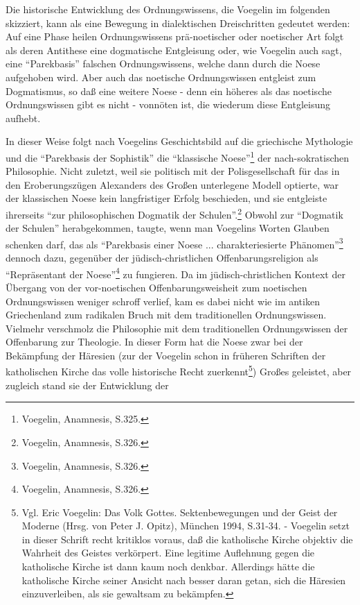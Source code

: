 Die historische Entwicklung des Ordnungswissens, die Voegelin im folgenden
skizziert, kann als eine Bewegung in dialektischen Dreischritten gedeutet
werden: Auf eine Phase heilen Ordnungswissens prä-noetischer oder noetischer
Art folgt als deren Antithese eine dogmatische Entgleisung oder, wie Voegelin
auch sagt, eine "`Parekbasis"' falschen Ordnungswissens, welche dann durch die
Noese aufgehoben wird. Aber auch das noetische Ordnungswissen entgleist zum
Dogmatismus, so daß eine weitere Noese - denn ein höheres als das noetische
Ordnungswissen gibt es nicht - vonnöten ist, die wiederum diese Entgleisung 
aufhebt.

In dieser Weise folgt nach Voegelins Geschichtsbild auf die griechische
Mythologie und die "`Parekbasis der Sophistik"' die "`klassische
Noese"'\footnote{Voegelin, Anamnesis, S.325.} der nach-sokratischen
Philosophie. Nicht zuletzt, weil sie politisch mit der Polisgesellschaft für
das in den Eroberungszügen Alexanders des Großen unterlegene Modell optierte,
war der klassischen Noese kein langfristiger Erfolg beschieden, und sie
entgleiste ihrerseits "`zur philosophischen Dogmatik der
Schulen"'.\footnote{Voegelin, Anamnesis, S.326.} Obwohl zur "`Dogmatik der
Schulen"' herabgekommen, taugte, wenn man Voegelins Worten Glauben schenken
darf, das als "`Parekbasis einer Noese ...  charakteriesierte
Phänomen"'\footnote{Voegelin, Anamnesis, S.326.} dennoch dazu, gegenüber der
jüdisch-christlichen Offenbarungsreligion als "`Repräsentant der
Noese"'\footnote{Voegelin, Anamnesis, S.326.} zu fungieren. Da im
jüdisch-christlichen Kontext der Übergang von der vor-noetischen
Offenbarungsweisheit zum noetischen Ordnungswissen weniger schroff verlief,
kam es dabei nicht wie im antiken Griechenland zum radikalen Bruch mit dem
traditionellen Ordnungswissen. Vielmehr verschmolz die Philosophie mit dem
traditionellen Ordnungswissen der Offenbarung zur Theologie. In dieser Form
hat die Noese zwar bei der Bekämpfung der Häresien (zur der Voegelin schon in
früheren Schriften der katholischen Kirche das volle historische Recht
zuerkennt\footnote{Vgl. Eric Voegelin: Das Volk Gottes. Sektenbewegungen
  und der Geist der Moderne (Hrsg. von Peter J. Opitz), München 1994, S.31-34.
  - Voegelin setzt in dieser Schrift recht kritiklos voraus, daß die
  katholische Kirche objektiv die Wahrheit des Geistes verkörpert. Eine
  legitime Auflehnung gegen die katholische Kirche ist dann kaum noch denkbar.
  Allerdings hätte die katholische Kirche seiner Ansicht nach besser daran
  getan, sich die Häresien einzuverleiben, als sie gewaltsam zu
  bekämpfen.}) Großes geleistet, aber zugleich stand sie der Entwicklung der
